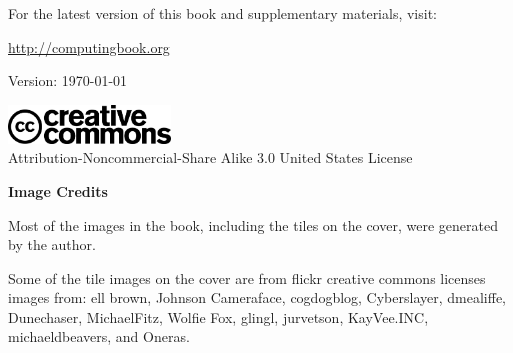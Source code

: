 \documentclass[10pt]{book}
\begin{document}
\begin{titlepage}
\clearpage
\pagestyle{empty}
\vspace*{5cm}

For the latest version of this book and supplementary materials, visit: 
\begin{center}
{\large \url{http://computingbook.org}}
\end{center}

\vspace*{7.5cm}
\begin{center}
{\small Version: \today}
\vspace*{2.5cm}
\end{center}
\begin{center}
\includegraphics[width=1.7in]{cover/cc-logo-large.png} \\
Attribution-Noncommercial-Share Alike 3.0 United States License
\end{center}


\end{titlepage}

\setcounter{tocdepth}{3}
\renewcommand{\cftpartpresnum}{\large\bfseries \partname\ }
\renewcommand{\cftpartaftersnum}{:}

\cleardoublepage
\pagestyle{plain}
\tableofcontents



\renewcommand{\cftloftitlefont}{\large\bfseries}
\setlength{\cftafterloftitleskip}{0pt}
\setlength{\cftfigindent}{0cm}
\setlength{\cftexplorationindent}{0cm}

\listofexploration
\listoffigures
\clearpage
\vspace*{3.5in}

{\bf Image Credits}

Most of the images in the book, including the tiles on the cover, were generated by the author.  

Some of the tile images on the cover are from flickr creative commons licenses images from: 
ell brown,
Johnson Cameraface,
cogdogblog,
Cyberslayer,
dme\-al\-if\-fe,
Dunechaser,
MichaelFitz, 
Wolfie Fox,  
glingl,
jurvetson,
KayVee.INC, 
michaeldbeavers,
and Oneras.
\end{document}
